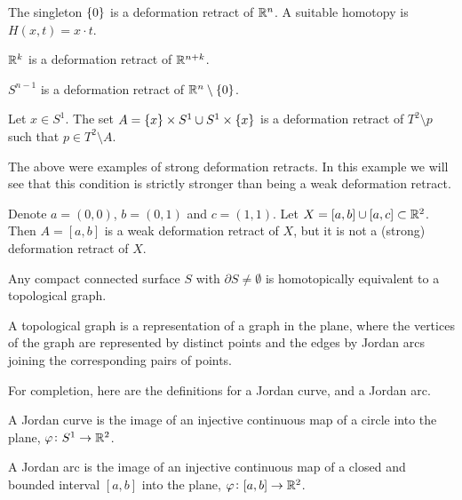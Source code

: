 \documentclass[11pt,a4paper]{article}
\begin{document}
\begin{example}
  The singleton $\left\{0\right\}$ is a deformation retract of $\mathbb{R}^n$.
  A suitable homotopy is $H(x,t) = x \cdot t$.
\end{example}

\begin{example}
    $\mathbb{R}^k$ is a deformation retract of $\mathbb{R}^{n+k}$.
\end{example}

\begin{example}
  $S^{n-1}$ is a deformation retract of $\mathbb{R}^n \setminus \left\{0\right\}$.
\end{example}

\begin{example}
  Let $x \in S^1$.
  The set $A = \left\{x\right\} \times S^1 \cup S^1 \times \left\{x\right\}$ is a deformation
  retract of $T^2 \setminus{p}$ such that $p \in T^2 \setminus A$.
\end{example}

\begin{example}
  The above were examples of strong deformation retracts.
  In this example we will see that this condition is strictly
  stronger than being a weak deformation retract.

  Denote $a = (0,0)$, $b = (0,1)$ and $c = (1,1)$.
  Let $X = [a,b] \cup [a,c] \subset \mathbb{R}^2$.
  Then $A = [a,b]$ is a weak deformation retract of $X$,
  but it is not a (strong) deformation retract of $X$.
\end{example}

\begin{remark}
  Any compact connected surface $S$ with $\partial S \neq \emptyset$ is
  homotopically equivalent to a topological graph.
\end{remark}
\begin{remark}
  A topological graph is a representation of a graph in the plane,
  where the vertices of the graph are represented by distinct points and the
  edges by Jordan arcs joining the corresponding pairs of points.
\end{remark}

For completion, here are the definitions for a Jordan curve, and a
Jordan arc.

\begin{definition}
  A Jordan curve is the image of an injective continuous map of a circle
  into the plane, $\varphi \colon S^1 \to \mathbb{R}^2$.
\end{definition}

\begin{definition}
  A Jordan arc is the image of an injective continuous map of a closed
  and bounded interval $[a,b]$
  into the plane, $\varphi \colon [a,b] \to \mathbb{R}^2$.
\end{definition}
\end{document}

